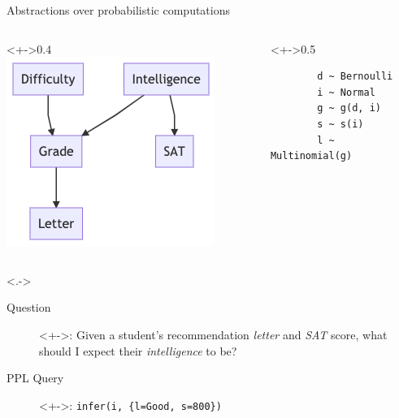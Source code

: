 \documentclass[12pt]{beamer}
\begin{document}
\begin{frame}[fragile]{Abstractions over probabilistic computations}

\begin{columns}
    \begin{column}<+->{0.4\textwidth}
        \centering
        \vspace{0.5cm}
        \includegraphics[width=\linewidth]{figures/student-network.png}
    \end{column}
    \begin{column}<+->{0.5\textwidth}
        \begin{verbatim}
        d ~ Bernoulli
        i ~ Normal
        g ~ g(d, i)
        s ~ s(i)
        l ~ Multinomial(g)
        \end{verbatim}
    \end{column}
\end{columns}


\only<.->{
    \begin{description}
        \item[Question]<+->: Given a student's recommendation \emph{letter} and \emph{SAT} score,
            what should I expect their \emph{intelligence} to be?
        \item[PPL Query]<+->: \texttt{infer(i, \{l=Good, s=800\})}
    \end{description}
}
\end{frame}
\end{document}
